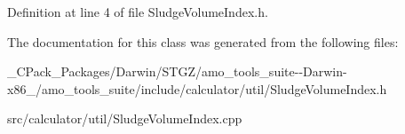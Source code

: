 Definition at line 4 of file Sludge\+Volume\+Index.\+h.



The documentation for this class was generated from the following files\+:\begin{DoxyCompactItemize}
\item 
\+\_\+\+C\+Pack\+\_\+\+Packages/\+Darwin/\+S\+T\+G\+Z/amo\+\_\+tools\+\_\+suite-\/-\/\+Darwin-\/x86\+\_/amo\+\_\+tools\+\_\+suite/include/calculator/util/Sludge\+Volume\+Index.\+h\item 
src/calculator/util/Sludge\+Volume\+Index.\+cpp\end{DoxyCompactItemize}
